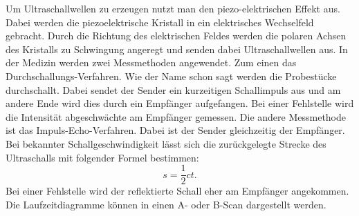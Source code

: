 Um Ultraschallwellen zu erzeugen nutzt man den piezo-elektrischen Effekt aus.
Dabei werden die piezoelektrische Kristall in ein elektrisches Wechselfeld gebracht.
Durch die Richtung des elektrischen Feldes werden die polaren Achsen des Kristalls zu Schwingung angeregt und
senden dabei Ultraschallwellen aus.
In der Medizin werden zwei Messmethoden angewendet.
Zum einen das Durchschallungs-Verfahren. Wie der Name schon sagt werden die Probestücke durchschallt. Dabei sendet
der Sender ein kurzeitigen Schallimpuls aus und am andere Ende wird dies durch ein Empfänger aufgefangen.
Bei einer Fehlstelle wird die Intensität abgeschwächte am Empfänger gemessen.
Die andere Messmethode ist das Impuls-Echo-Verfahren. Dabei ist der Sender gleichzeitig der Empfänger. Bei bekannter Schallgeschwindigkeit
lässt sich die zurückgelegte Strecke des Ultraschalls mit folgender Formel bestimmen:
\begin{equation}
  s=\frac{1}{2} c t.
  \label{eq:6}
\end{equation}
Bei einer Fehlstelle wird der reflektierte Schall eher am Empfänger angekommen.
Die Laufzeitdiagramme können in einen A- oder B-Scan dargestellt werden.
